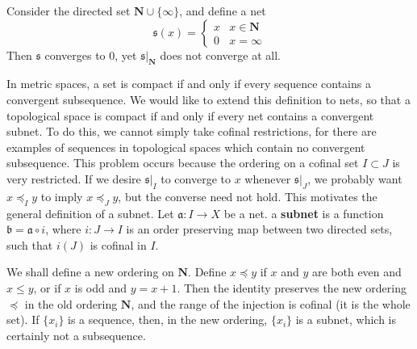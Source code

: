 \begin{example}
    Consider the directed set $\mathbf{N} \cup \{ \infty \}$, and define a net
    \[ \mathfrak{s}(x) = \begin{cases} x & x \in \mathbf{N} \\ 0 & x = \infty \end{cases} \]
    Then $\mathfrak{s}$ converges to $0$, yet $\mathfrak{s}|_\mathbf{N}$ does not converge at all.
\end{example}

In metric spaces, a set is compact if and only if every sequence contains a convergent subsequence. We would like to extend this definition to nets, so that a topological space is compact if and only if every net contains a convergent subnet. To do this, we cannot simply take cofinal restrictions, for there are examples of sequences in topological spaces which contain no convergent subsequence. This problem occurs because the ordering on a cofinal set $I \subset J$ is very restricted. If we desire $\mathfrak{s}|_I$ to converge to $x$ whenever $\mathfrak{s}|_J$, we probably want $x \preceq_I y$ to imply $x \preceq_J y$, but the converse need not hold. This motivates the general definition of a subnet. Let $\mathfrak{a}: I \to X$ be a net. a {\bf subnet} is a function $\mathfrak{b} = \mathfrak{a} \circ i$, where $i: J \to I$ is an order preserving map between two directed sets, such that $i(J)$ is cofinal in $I$.

\begin{example}
    We shall define a new ordering on $\mathbf{N}$. Define $x \preceq y$ if $x$ and $y$ are both even and $x \leq y$, or if $x$ is odd and $y = x + 1$. Then the identity preserves the new ordering $\preceq$ in the old ordering $\mathbf{N}$, and the range of the injection is cofinal (it is the whole set). If $\{ x_i \}$ is a sequence, then, in the new ordering, $\{ x_i \}$ is a subnet, which is certainly not a subsequence.
\end{example}

